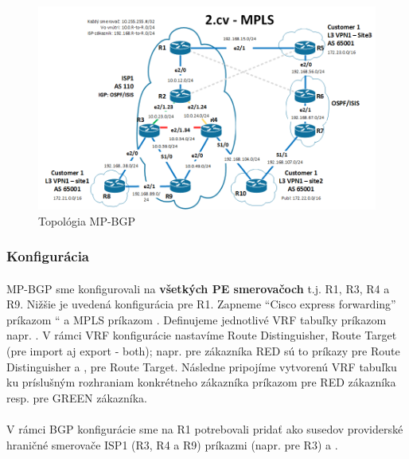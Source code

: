 \documentclass[12pt,twoside,a4paper]{report}
\begin{document}
\begin{figure}[!htbp]
\centering
\includegraphics[width=14cm,keepaspectratio]{mpls_l3vpn_topo}
\caption{Topológia MP-BGP}
\label{fig:mpls_mpbgp_topo}
\end{figure}

\subsubsection{Konfigurácia}
\paragraph{}
MP-BGP sme konfigurovali na \textbf{všetkých PE smerovačoch} t.j. R1, R3, R4 a R9. Nižšie je uvedená konfigurácia pre R1. Zapneme “Cisco express forwarding” príkazom “ a MPLS príkazom . Definujeme jednotlivé VRF tabuľky príkazom  napr. . V rámci VRF konfigurácie nastavíme Route Distinguisher, Route Target (pre import aj export - both); napr. pre zákazníka RED sú to príkazy  pre Route Distinguisher a ,  pre Route Target. Následne pripojíme vytvorenú VRF tabuľku ku príslušným rozhraniam konkrétneho zákazníka príkazom  pre RED zákazníka resp.  pre GREEN zákazníka.

\paragraph{}
V rámci BGP konfigurácie sme na R1 potrebovali pridať ako susedov providerské hraničné smerovače ISP1 (R3, R4 a R9) príkazmi (napr. pre R3)  a .
\end{document}
